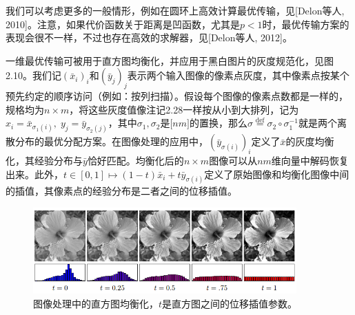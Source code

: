 \documentclass[cn,10pt,math=newtx,citestyle=gb7714-2015,bibstyle=gb7714-2015]{elegantbook}
\begin{document}
我们可以考虑更多的一般情形，例如在圆环上高效计算最优传输，见[Delon等人, 2010]。注意，如果代价函数关于距离是凹函数，尤其是$p<1$时，最优传输方案的表现会很不一样，不过也存在高效的求解器，见[Delon等人, 2012]。

\begin{postulate}[直方图均衡化]
一维最优传输可被用于直方图均衡化，并应用于黑白图片的灰度规范化，见图2.10。我们记$(\bar{x}_i)_i$和$(\bar{y}_j)_j$表示两个输入图像的像素点灰度，其中像素点按某个预先约定的顺序访问（例如：按列扫描）。假设每个图像的像素点数都是一样的，规格均为$n\times m$，将这些灰度值像注记2.28一样按从小到大排列，记为$x_i=\bar{x}_{\sigma_1(i)},\;y_j=\bar{y}_{\sigma_2(j)}$，其中$\sigma_1,\sigma_2$是$\mathbb{[}nm\mathbb{]}$的置换，那么$\sigma \overset{\text{def}}{=} \sigma_2\circ \sigma_1^{-1}$就是两个离散分布的最优分配方案。在图像处理的应用中，$(\bar{y}_{\sigma(i)})_i$定义了$\bar x$的灰度均衡化，其经验分布与$\bar y$恰好匹配。均衡化后的$n\times m$图像可以从$nm$维向量中解码恢复出来。此外，$t\in [0,1] \mapsto (1-t)\bar{x}_i+t\bar{y}_{\sigma(i)}$定义了原始图像和均衡化图像中间的插值，其像素点的经验分布是二者之间的位移插值。
\end{postulate}

\begin{figure}[H]
    \centering
    \includegraphics[width=0.9\textwidth]{figure/fig2.10.png}
    \caption{图像处理中的直方图均衡化，$t$是直方图之间的位移插值参数。}
    \label{图2.10}
\end{figure}
\end{document}
